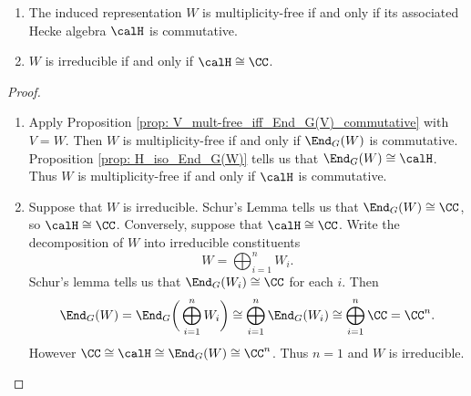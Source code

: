 \begin{cor}\label{cor: H_commutative}
    \begin{enumerate}[\itshape(i)]
        \item The induced representation $W$ is multiplicity-free if and only if its associated Hecke algebra $\calH$ is commutative.
        \item $W$ is irreducible if and only if $\calH \cong \CC$.
    \end{enumerate}
\end{cor}
\begin{proof}
    \begin{enumerate}[\itshape(i)]
        \item Apply Proposition \ref{prop: V_mult-free_iff_End_G(V)_commutative} with $V=W$.
              Then $W$ is multiplicity-free if and only if $\End_G(W)$ is commutative.
              Proposition \ref{prop: H_iso_End_G(W)} tells us that $\End_G(W)\cong\calH$.
              Thus $W$ is multiplicity-free if and only if $\calH$ is commutative.

        \item Suppose that $W$ is irreducible.
              Schur's Lemma tells us that $\End_G(W)\cong\CC$, so $\calH\cong\CC$.
              Conversely, suppose that $\calH\cong\CC$.
              Write the decomposition of $W$ into irreducible constituents
              \[
                  W = \bigoplus_{i=1}^n W_i.
              \]
              Schur's lemma tells us that $\End_G(W_i)\cong \CC$ for each $i$.
              Then
              \[
                  \End_G(W) = \End_G\bigg(\bigoplus_{i=1}^n W_i\bigg) \cong \bigoplus_{i=1}^n \End_G(W_i) \cong \bigoplus_{i=1}^n \CC = \CC^n.
              \]
              However $\CC\cong\calH\cong\End_G(W)\cong\CC^n$.
              Thus $n=1$ and $W$ is irreducible. \qedhere
    \end{enumerate}
\end{proof}


